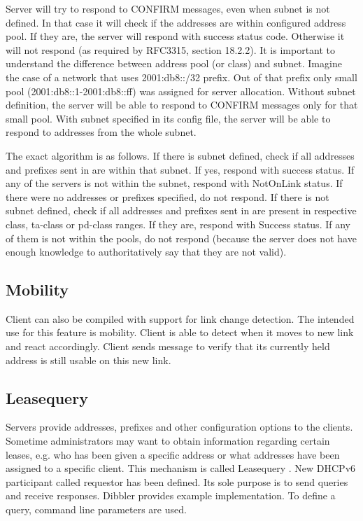 Server will try to respond to CONFIRM messages, even when subnet is
not defined. In that case it will check if the addresses are within
configured address pool. If they are, the server will respond with
success status code. Otherwise it will not respond (as required by
RFC3315, section 18.2.2). It is important to understand the difference
between address pool (or class) and subnet. Imagine the case of a
network that uses 2001:db8::/32 prefix. Out of that prefix only small
pool (2001:db8::1-2001:db8::ff) was assigned for server
allocation. Without subnet definition, the server will be able to
respond to CONFIRM messages only for that small pool. With subnet
specified in its config file, the server will be able to respond to
addresses from the whole subnet.

The exact algorithm is as follows. If there is subnet defined, check
if all addresses and prefixes sent in  are within that
subnet. If yes, respond with success status. If any of the servers is
not within the subnet, respond with NotOnLink status. If there were no
addresses or prefixes specified, do not respond. If there is not
subnet defined, check if all addresses and prefixes sent
in  are present in respective class, ta-class or pd-class
ranges. If they are, respond with Success status. If any of them is
not within the pools, do not respond (because the server does not have
enough knowledge to authoritatively say that they are not valid).

\subsection{Mobility}
Client can also be compiled with support for link change detection.
The intended use for this feature is mobility. Client is able to
detect when it moves to new link and react accordingly. Client sends
 message to verify that its currently held address is
still usable on this new link.

\subsection{Leasequery}
\label{feature-leasequery}
Servers provide addresses, prefixes and other configuration options to
the clients. Sometime administrators may want to obtain information
regarding certain leases, e.g. who has been given a specific address
or what addresses have been assigned to a specific client. This
mechanism is called Leasequery \cite{rfc5007}. New DHCPv6 participant
called requestor has been defined. Its sole purpose is to send queries
and receive responses. Dibbler provides example implementation. To
define a query, command line parameters are used.

